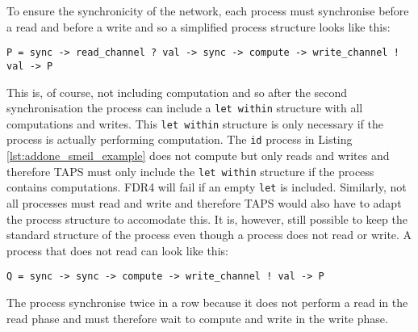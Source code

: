 To ensure the synchronicity of the network, each process must synchronise before a read and before a write and so a simplified process structure looks like this:
\begin{verbatim}
P = sync -> read_channel ? val -> sync -> compute -> write_channel ! val -> P
\end{verbatim}
This is, of course, not including computation and so after the second synchronisation the process can include a \texttt{let within} structure with all computations and writes. This \texttt{let within} structure is only necessary if the process is actually performing computation. The \texttt{id} process in Listing \ref{lst:addone_smeil_example} does not compute but only reads and writes and therefore TAPS must only include the \texttt{let within} structure if the process contains computations. FDR4 will fail if an empty \texttt{let} is included. Similarly, not all processes must read and write and therefore TAPS would also have to adapt the process structure to accomodate this. It is, however, still possible to keep the standard structure of the process even though a process does not read or write. A process that does not read can look like this:
\begin{verbatim}
Q = sync -> sync -> compute -> write_channel ! val -> P
\end{verbatim}
The process synchronise twice in a row because it does not perform a read in the read phase and must therefore wait to compute and write in the write phase. \\

